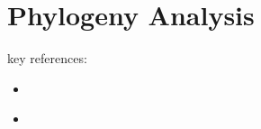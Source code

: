 \section{Phylogeny Analysis}

key references:
\begin{itemize}
  \item \citep{moreno2024ecology}
  \item \citep{hernandez2022can,shahbandegan2022untangling}
\end{itemize}
